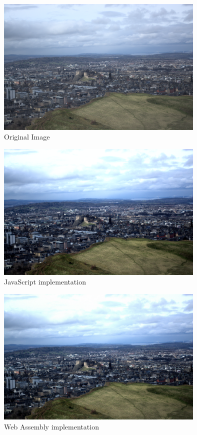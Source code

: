 \documentclass[12pt,a4paper]{article}
\begin{document}
\begin{figure}[H]
    \centering
    \includegraphics[width=10cm]{no_blur.png}
    \caption{Original Image}
\end{figure}
\begin{figure}[H]
    \centering
    \includegraphics[width=10cm]{js.png}
    \caption{JavaScript implementation}
\end{figure}
\begin{figure}[H]
    \centering
    \includegraphics[width=10cm]{wasm.png}
    \caption{Web Assembly implementation}
\end{figure}
\end{document}
